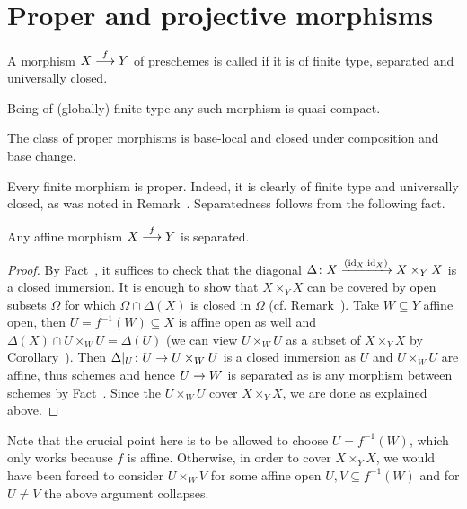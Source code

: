 \documentclass[a4paper,parskip=half,numbers=enddot, DIV=12]{scrreprt}
\begin{document}
\section{Proper and projective morphisms}
\begin{defi}
    A morphism $X\morphism[f] Y$ of preschemes is called  if it is of finite type, separated and universally closed.
\end{defi}
\begin{rem}
    \begin{alphanumerate}
    \item 
        Being of (globally) finite type any such morphism is quasi-compact.
    \item 
        The class of proper morphisms is base-local and closed under composition and base change.
    \end{alphanumerate}
\end{rem}
\begin{example}
    Every finite morphism is proper. Indeed, it is clearly of finite type and universally closed, as was noted in Remark~. Separatedness follows from the following fact.
\end{example}
\begin{fact}
	Any affine morphism $X\morphism[f]Y$ is separated.
\end{fact}
\begin{proof}
	By Fact~, it suffices to check that the diagonal $\Delta\colon X\xrightarrow{(\operatorname{id}_X,\operatorname{id}_X)}X\times_YX$ is a closed immersion. It is enough to show that $X\times_YX$ can be covered by open subsets $\Omega$ for which $\Omega\cap\Delta(X)$ is closed in $\Omega$ (cf. Remark~). Take $W\subseteq Y$ affine open, then $U=f^{-1}(W)\subseteq X$ is affine open as well and $\Delta(X)\cap U\times_WU=\Delta(U)$ (we can view $U\times_WU$ as a subset of $X\times_YX$ by Corollary~). Then $\Delta|_U\colon U\morphism U\times_WU$ is a closed immersion as $U$ and $U\times_WU$ are affine, thus schemes and hence $U\morphism W$ is separated as is any morphism between schemes by Fact~. 
	Since the $U\times_WU$ cover $X\times_YX$, we are done as explained above.
\end{proof}
Note that the crucial point here is to be allowed to choose $U=f^{-1}(W)$, which only works because $f$ is affine. Otherwise, in order to cover $X\times_YX$, we would have been forced to consider $U\times_WV$ for some affine open $U,V\subseteq f^{-1}(W)$ and for $U\neq V$ the above argument collapses.
\end{document}

